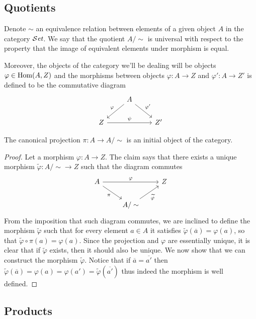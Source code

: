 \subsection{Quotients}

Denote \(\sim\) an equivalence relation between elements of a given object
\(A\) in the category \({\mathcal{S}\textit{et}}\). We say that the quotient \(A/\sim\) is
universal with respect to the property that the image of equivalent elements
under morphism is equal.

Moreover, the objects of the category we'll be dealing will be objects
\(\varphi \in \operatorname{Hom}(A, Z)\) and the morphisms between objects \(\varphi : A \to
Z\) and \(\varphi' : A \to Z'\) is defined to be the commutative diagram
\[
  \begin{tikzcd}
      &A \ar[dl, swap, "\varphi"] \ar[dr, "\varphi'"] & \\
    Z \ar[rr, "\psi"] & &Z'
  \end{tikzcd}
\]

\begin{proposition}
   The canonical projection \(\pi : A \to A/\sim\) is an initial object of the
   category.
\end{proposition}

\begin{proof}
   Let a morphism \(\varphi: A \to Z\). The claim says that there exists a
   unique morphism \(\tilde{\varphi} : A/\sim \to Z\) such that the diagram
   commutes
    \[
      \begin{tikzcd}
        A \ar[rr, "\varphi"] \ar[dr, swap, "\pi"]
          &
            & Z \\
          & A/\sim \ar[ur, swap, "\widetilde \varphi"]
      \end{tikzcd}
   \]
   From the imposition that such diagram commutes, we are inclined to define the
   morphism \(\tilde\varphi\) such that for every element \(a \in A\) it
   satisfies \(\tilde\varphi(\overline{a}) = \varphi(a)\), so that
   \(\tilde\varphi \circ \pi (a) = \varphi(a)\). Since the projection and
   \(\varphi\) are essentially unique, it is clear that if \(\tilde\varphi\)
   exists, then it should also be unique. We now show that we can construct the
   morphism \(\tilde\varphi\). Notice that if \(\overline{a} = \overline{a'}\)
   then \(\tilde\varphi(\overline{a}) = \varphi(a)= \varphi(a') =
   \tilde\varphi(\overline{a'})\) thus indeed the morphism is well defined.
\end{proof}

\subsection{Products}

